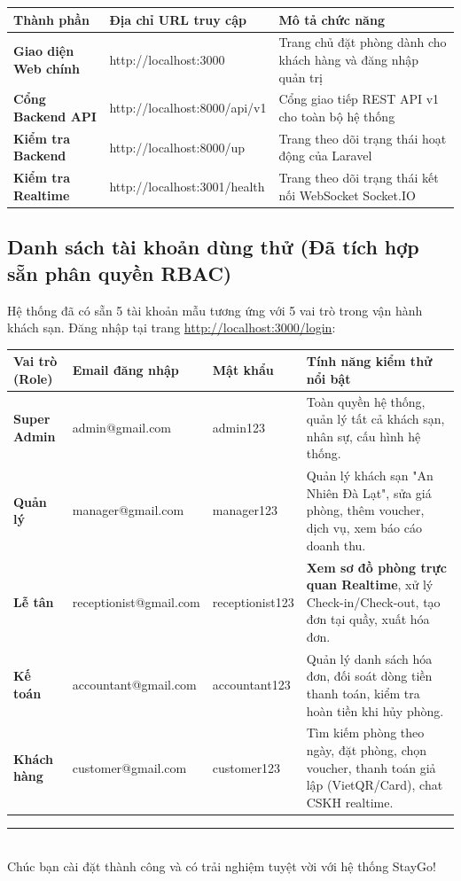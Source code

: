 \documentclass[11pt,a4paper]{article}
\begin{document}
\begin{table}[htbp]
  \centering
  \fontsize{9}{11.5}\selectfont
  \begin{tabularx}{\textwidth}{>{\bfseries}p{32mm}>{\ttfamily}p{52mm}>{\raggedright\arraybackslash}X}
    \toprule
    \textbf{Thành phần} & \textbf{Địa chỉ URL truy cập} & \textbf{Mô tả chức năng} \\
    \midrule
    Giao diện Web chính & http://localhost:3000 & Trang chủ đặt phòng dành cho khách hàng và đăng nhập quản trị \\
    Cổng Backend API & http://localhost:8000/api/v1 & Cổng giao tiếp REST API v1 cho toàn bộ hệ thống \\
    Kiểm tra Backend & http://localhost:8000/up & Trang theo dõi trạng thái hoạt động của Laravel \\
    Kiểm tra Realtime & http://localhost:3001/health & Trang theo dõi trạng thái kết nối WebSocket Socket.IO \\
    \bottomrule
  \end{tabularx}
\end{table}

\subsection{Danh sách tài khoản dùng thử (Đã tích hợp sẵn phân quyền RBAC)}

Hệ thống đã có sẵn 5 tài khoản mẫu tương ứng với 5 vai trò trong vận hành khách sạn. Đăng nhập tại trang \url{http://localhost:3000/login}:

\begin{table}[htbp]
  \centering
  \fontsize{8.5}{11}\selectfont
  \begin{tabularx}{\textwidth}{>{\bfseries}p{22mm}>{\ttfamily}p{44mm}>{\ttfamily}p{26mm}>{\raggedright\arraybackslash}X}
    \toprule
    \textbf{Vai trò (Role)} & \textbf{Email đăng nhập} & \textbf{Mật khẩu} & \textbf{Tính năng kiểm thử nổi bật} \\
    \midrule
    Super Admin & admin@gmail.com & admin123 & Toàn quyền hệ thống, quản lý tất cả khách sạn, nhân sự, cấu hình hệ thống. \\
    Quản lý & manager@gmail.com & manager123 & Quản lý khách sạn "An Nhiên Đà Lạt", sửa giá phòng, thêm voucher, dịch vụ, xem báo cáo doanh thu. \\
    Lễ tân & receptionist@gmail.com & receptionist123 & \textbf{Xem sơ đồ phòng trực quan Realtime}, xử lý Check-in/Check-out, tạo đơn tại quầy, xuất hóa đơn. \\
    Kế toán & accountant@gmail.com & accountant123 & Quản lý danh sách hóa đơn, đối soát dòng tiền thanh toán, kiểm tra hoàn tiền khi hủy phòng. \\
    Khách hàng & customer@gmail.com & customer123 & Tìm kiếm phòng theo ngày, đặt phòng, chọn voucher, thanh toán giả lập (VietQR/Card), chat CSKH realtime. \\
    \bottomrule
  \end{tabularx}
\end{table}



\vspace{3mm}
\begin{center}
  \noindent\rule{0.6\textwidth}{0.8pt}\\
  \vspace{1.5mm}
  {\small Chúc bạn cài đặt thành công và có trải nghiệm tuyệt vời với hệ thống StayGo!}
\end{center}
\end{document}
